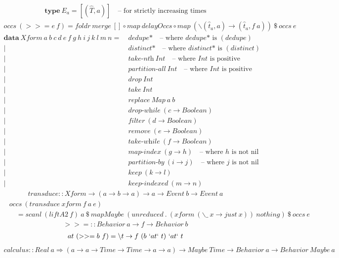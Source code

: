 \documentclass[fleqn]{amsart}
\newcommand{\zeroarity}[1]{&\ \textit{#1*}\quad\text{-- where }\textit{#1*}\text{ is }(#1)}
\newcommand{\positive}[1]{&\ \textit{#1}\ Int\quad\text{-- where }Int\text{ is positive}}
\newcommand{\integer}[1]{&\ #1\ Int}
\newcommand{\predicate}[2]{&\ \textit{#1}\ (#2 \rightarrow Boolean)}
\newcommand{\nonnillable}[3]{&\ \textit{#1}\ (#2 \rightarrow #3)\quad\text{-- where }#3\text{ is not nil}}
\newcommand{\any}[3]{&\ \textit{#1}\ (#2 \rightarrow #3)}
\begin{document}
\begin{align*}
  \mathbf{type}\ E_a = [(\hat{T}, a)]\quad\text{-- for strictly increasing times}
\end{align*}
\begin{align*}
  occs\ (>>= e\ f) = foldr\ merge\ []\circ map\ delayOccs\circ map\ (\backslash(\hat{t}_a, a) \rightarrow (\hat{t}_a , f\ a))\ \$ \ occs\ e
\end{align*}
\begin{align*}
  \mathbf{data}\ Xform\ a\ b\ c\ d\ e\ f\ g\ h\ i\ j\ k\ l\ m\ n =\zeroarity{dedupe}\\
  |\zeroarity{distinct}\\
  |\positive{take-nth}\\
  |\positive{partition-all}\\
  |\integer{drop}\\
  |\integer{take}\\
  |&\ replace\ Map\ a\ b\\
  |\predicate{drop-while}{c}\\
  |\predicate{filter}{d}\\
  |\predicate{remove}{e}\\
  |\predicate{take-while}{f}\\
  |\nonnillable{map-index}{g}{h}\\
  |\nonnillable{partition-by}{i}{j}\\
  |\any{keep}{k}{l}\\
  |\any{keep-indexed}{m}{n}
\end{align*}
\begin{align*}
  transduce :: Xform \rightarrow (a \rightarrow b \rightarrow a) \rightarrow a \rightarrow Event\ b \rightarrow Event\ a
\end{align*}
\begin{align*}
  &occs\ (transduce\ xform\ f\ a\ e)\\
  &\quad= scanl\ (liftA2\ f)\ a\ \$\ mapMaybe\ (unreduced\ .\ (xform\ (\backslash\_\ x\rightarrow just\ x))\ nothing)\ \$\ occs\ e
\end{align*}
\begin{align*}
  >>= :: Behavior\ a \rightarrow f \rightarrow Behavior\ b
\end{align*}
\begin{align*}
  at\ (>>= b\ f) =\backslash t \rightarrow f\ (b\ `at` \ t)\ `at` \ t
\end{align*}
\begin{align*}
  calculus :: Real\ a\Rightarrow (a \rightarrow a \rightarrow Time \rightarrow Time \rightarrow a \rightarrow a) \rightarrow Maybe\ Time \rightarrow Behavior\ a\rightarrow Behavior\ Maybe\ a
\end{align*}
\end{document}

